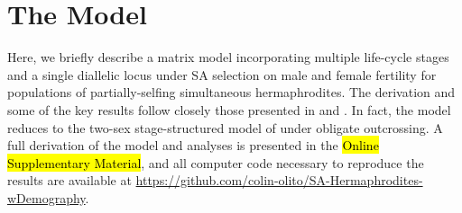 \documentclass[11pt]{article}
\begin{document}




\section*{The Model}

Here, we briefly describe a matrix model incorporating multiple life-cycle stages and a single diallelic locus under SA selection on male and female fertility for populations of partially-selfing simultaneous hermaphrodites. The derivation and some of the key results follow closely those presented in \citet{deVriesCaswell2019a} and \citet{deVriesCaswell2019b}. In fact, the model reduces to the two-sex stage-structured model of \citet{deVriesCaswell2019b} under obligate outcrossing. A full derivation of the model and analyses is presented in the \hl{Online Supplementary Material}, and all computer code necessary to reproduce the results are available at \url{https://github.com/colin-olito/SA-Hermaphrodites-wDemography}.
\end{document}
